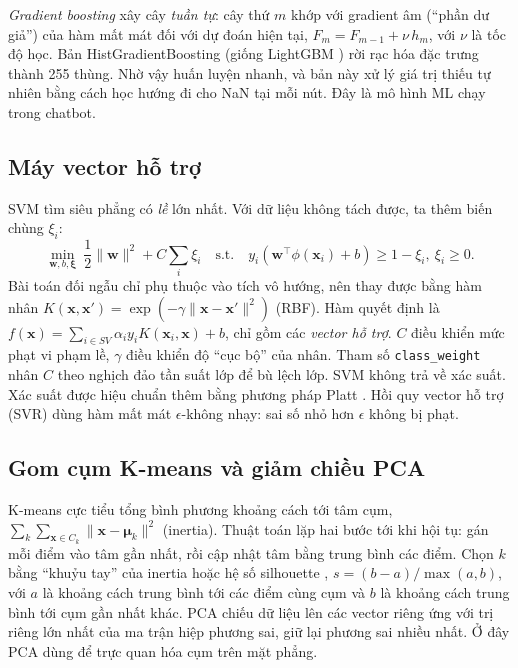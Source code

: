 \emph{Gradient boosting} \cite{friedman2001} xây cây \emph{tuần tự}: cây thứ $m$ khớp với gradient âm (``phần dư giả'') của hàm mất mát đối với dự đoán hiện tại, $F_m = F_{m-1} + \nu\, h_m$, với $\nu$ là tốc độ học. Bản HistGradientBoosting (giống LightGBM \cite{ke2017}) rời rạc hóa đặc trưng thành 255 thùng. Nhờ vậy huấn luyện nhanh, và bản này xử lý giá trị thiếu tự nhiên bằng cách học hướng đi cho NaN tại mỗi nút. Đây là mô hình ML chạy trong chatbot.

\subsection{Máy vector hỗ trợ}

SVM \cite{cortes1995} tìm siêu phẳng có \emph{lề} lớn nhất. Với dữ liệu không tách được, ta thêm biến chùng $\xi_i$:
\begin{equation}
\min_{\mathbf w,b,\boldsymbol\xi}\ \frac12\|\mathbf w\|^2 + C\sum_{i}\xi_i \quad\text{s.t.}\quad y_i(\mathbf w^\top\phi(\mathbf x_i)+b)\ge 1-\xi_i,\ \xi_i\ge 0 .
\label{eq:svm}
\end{equation}
Bài toán đối ngẫu chỉ phụ thuộc vào tích vô hướng, nên thay được bằng hàm nhân $K(\mathbf x,\mathbf x')=\exp(-\gamma\|\mathbf x-\mathbf x'\|^2)$ (RBF). Hàm quyết định là $f(\mathbf x)=\sum_{i\in SV}\alpha_i y_i K(\mathbf x_i,\mathbf x)+b$, chỉ gồm các \emph{vector hỗ trợ}. $C$ điều khiển mức phạt vi phạm lề, $\gamma$ điều khiển độ ``cục bộ'' của nhân. Tham số \texttt{class\_weight} nhân $C$ theo nghịch đảo tần suất lớp để bù lệch lớp. SVM không trả về xác suất. Xác suất được hiệu chuẩn thêm bằng phương pháp Platt \cite{platt1999}. Hồi quy vector hỗ trợ (SVR) dùng hàm mất mát $\epsilon$-không nhạy: sai số nhỏ hơn $\epsilon$ không bị phạt.

\subsection{Gom cụm K-means và giảm chiều PCA}

K-means \cite{lloyd1982} cực tiểu tổng bình phương khoảng cách tới tâm cụm, $\sum_{k}\sum_{\mathbf x\in C_k}\|\mathbf x-\boldsymbol\mu_k\|^2$ (inertia). Thuật toán lặp hai bước tới khi hội tụ: gán mỗi điểm vào tâm gần nhất, rồi cập nhật tâm bằng trung bình các điểm. Chọn $k$ bằng ``khuỷu tay'' của inertia hoặc hệ số silhouette \cite{rousseeuw1987}, $s=(b-a)/\max(a,b)$, với $a$ là khoảng cách trung bình tới các điểm cùng cụm và $b$ là khoảng cách trung bình tới cụm gần nhất khác. PCA chiếu dữ liệu lên các vector riêng ứng với trị riêng lớn nhất của ma trận hiệp phương sai, giữ lại phương sai nhiều nhất. Ở đây PCA dùng để trực quan hóa cụm trên mặt phẳng.

